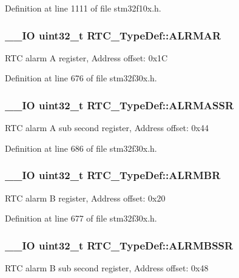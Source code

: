 Definition at line 1111 of file stm32f10x.\-h.

\hypertarget{struct_r_t_c___type_def_ad7e54d5c5a4b9fd1e26aca85b1e36c7f}{
\subsubsection[{A\-L\-R\-M\-A\-R}]{\setlength{\rightskip}{0pt plus 5cm}\-\_\-\-\_\-\-I\-O {\bf uint32\-\_\-t} R\-T\-C\-\_\-\-Type\-Def\-::\-A\-L\-R\-M\-A\-R}}\label{struct_r_t_c___type_def_ad7e54d5c5a4b9fd1e26aca85b1e36c7f}
R\-T\-C alarm A register, Address offset\-: 0x1\-C 

Definition at line 676 of file stm32f30x.\-h.

\hypertarget{struct_r_t_c___type_def_ac5b2e3c0dcdcb569f3fe15dfe3794bc1}{
\subsubsection[{A\-L\-R\-M\-A\-S\-S\-R}]{\setlength{\rightskip}{0pt plus 5cm}\-\_\-\-\_\-\-I\-O {\bf uint32\-\_\-t} R\-T\-C\-\_\-\-Type\-Def\-::\-A\-L\-R\-M\-A\-S\-S\-R}}\label{struct_r_t_c___type_def_ac5b2e3c0dcdcb569f3fe15dfe3794bc1}
R\-T\-C alarm A sub second register, Address offset\-: 0x44 

Definition at line 686 of file stm32f30x.\-h.

\hypertarget{struct_r_t_c___type_def_a9816616e1f00955c8982469d0dd9c953}{
\subsubsection[{A\-L\-R\-M\-B\-R}]{\setlength{\rightskip}{0pt plus 5cm}\-\_\-\-\_\-\-I\-O {\bf uint32\-\_\-t} R\-T\-C\-\_\-\-Type\-Def\-::\-A\-L\-R\-M\-B\-R}}\label{struct_r_t_c___type_def_a9816616e1f00955c8982469d0dd9c953}
R\-T\-C alarm B register, Address offset\-: 0x20 

Definition at line 677 of file stm32f30x.\-h.

\hypertarget{struct_r_t_c___type_def_a249009cd672e7bcd52df1a41de4619e1}{
\subsubsection[{A\-L\-R\-M\-B\-S\-S\-R}]{\setlength{\rightskip}{0pt plus 5cm}\-\_\-\-\_\-\-I\-O {\bf uint32\-\_\-t} R\-T\-C\-\_\-\-Type\-Def\-::\-A\-L\-R\-M\-B\-S\-S\-R}}\label{struct_r_t_c___type_def_a249009cd672e7bcd52df1a41de4619e1}
R\-T\-C alarm B sub second register, Address offset\-: 0x48 


